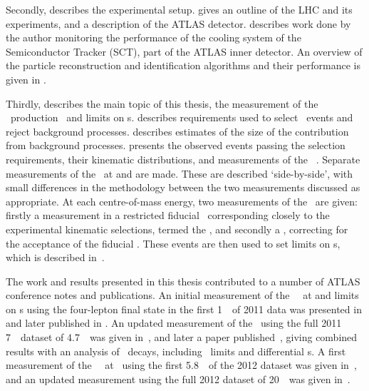 Secondly,  describes the experimental setup.
 gives an outline of the LHC and its experiments, and a
description of the ATLAS detector.  describes work done by the author
monitoring the performance of the cooling system of the Semiconductor Tracker
(SCT), part of the ATLAS inner detector. An overview of the particle reconstruction and
identification algorithms and their performance is given in
.

Thirdly,  describes the main topic of this thesis, the
measurement of the \ZZ\ production \cx\ and limits on \TGC s. 
 describes requirements used to select \ZZ\
events and reject background processes.  describes
estimates of the size of the contribution from background processes.
\chap{CrossSection} presents the observed events passing the selection
requirements, their kinematic distributions, and measurements of the \ZZ\ \cx.
Separate measurements of the \cx\ at \sqrtseq{7} and \sqrtseq{8} are made. These
are described `side-by-side', with small differences in the methodology between
the two measurements discussed as appropriate. At each centre-of-mass energy,
two measurements of the \cx\ are given: firstly a measurement in a restricted
fiducial \phasespace\ corresponding closely to the experimental kinematic
selections, termed the \intro{fiducial \cx}, and secondly a \intro{total} \cx,
correcting for the acceptance of the fiducial \phasespace.
These events are then used to set limits on \TGC s, which is described
in~\chap{TGCLimits}.

The work and results presented in this thesis contributed to a number of ATLAS conference
notes and publications. An initial measurement of the \ZZ\ \cx\ at \sqrtseq{7}
and limits on \TGC s using the four-lepton final state in the first 1~\ifb\ of
2011 data was
presented in \cite{ATLAS-CONF-2011-107} and later published in
\cite{ATLAS_ZZ4l:1fb2011}. An updated measurement of the \cx\ using the full
2011 7~\tev\ dataset of 4.7~\ifb\ was given in~\cite{ATLAS-CONF-2012-026}, and later
a paper published~\cite{ATLAS:2012kg}, giving combined results with an analysis
of \ZZllvv\ decays, including \TGC\ limits and differential \cx s.
A first measurement of the \ZZ\ \cx\ at \sqrtseq{8} \cx\ using the first
5.8~\ifb\ of the 2012 dataset was given in~\cite{ATLAS-CONF-2012-090}, and an
updated measurement using the full 2012 dataset of 20~\ifb\ was given in~\cite{ATLAS-CONF-2013-020}.

